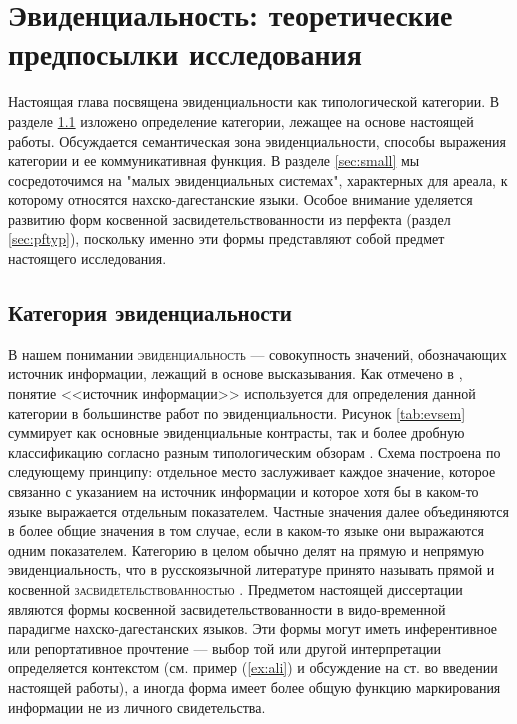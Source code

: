 
\chapter{Эвиденциальность: теоретические предпосылки исследования} \label{sec:ch1}

Настоящая глава посвящена эвиденциальности как типологической категории. В разделе \ref{sec:cat} изложено определение категории, лежащее на основе настоящей работы. Обсуждается семантическая зона эвиденциальности, способы выражения категории и ее коммуникативная функция. В разделе \ref{sec:small} мы сосредоточимся на "малых эвиденциальных системах", характерных для ареала, к которому относятся нахско-дагестанские языки. Особое внимание уделяется развитию форм косвенной засвидетельствованности из перфекта (раздел \ref{sec:pftyp}), поскольку именно эти формы представляют собой предмет настоящего исследования.

\section{Категория эвиденциальности} \label{sec:cat}

В нашем понимании \textsc{эвиденциальность} --- совокупность значений, обозначающих источник информации, лежащий в основе высказывания. Как отмечено в \citep[263--264]{boye2018}, понятие <<источник информации>> используется для определения данной категории в большинстве работ по эвиденциальности. Рисунок \ref{tab:evsem} суммирует как основные эвиденциальные контрасты, так и более дробную классификацию согласно разным типологическим обзорам \citep{willett1988, aikhenvald2004, plungian2010}. Схема построена по следующему принципу: отдельное место заслуживает каждое значение, которое связанно с указанием на источник информации и которое хотя бы в каком-то языке выражается отдельным показателем. Частные значения далее объединяются в более общие значения в том случае, если в каком-то языке они выражаются одним показателем. Категорию в целом обычно делят на прямую и непрямую эвиденциальность, что в русскоязычной литературе принято называть прямой и косвенной \textsc{засвидетельствованностью} \citep{kozintseva2007}. Предметом настоящей диссертации являются формы косвенной засвидетельствованности в видо-временной парадигме нахско-дагестанских языков. Эти формы могут иметь инферентивное или репортативное прочтение --- выбор той или другой интерпретации определяется контекстом (см. пример (\ref{ex:ali}) и обсуждение на ст. \pageref{p:context} во введении настоящей работы), а иногда форма имеет более общую функцию маркирования информации не из личного свидетельства.

